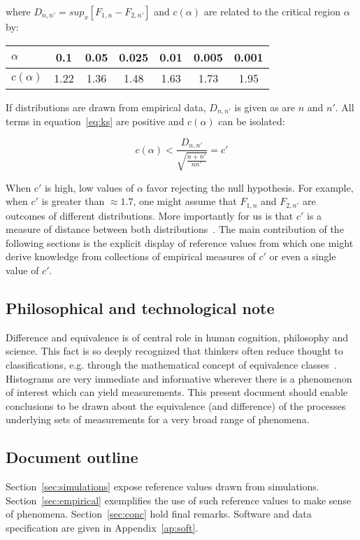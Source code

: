 \documentclass[%
	aip,
	jmp,%
	amsmath,amssymb,
	reprint,%
]{revtex4-1}
\begin{document}
\noindent where $D_{n,n'}=sup_x[F_{1,n}-F_{2,n'}]$ and $c(\alpha)$ are related to the critical region $\alpha$ by:

\begin{table}[h!]
\centering
\begin{tabular}{|l||c|c|c|c|c|c|}\hline
$\alpha$    & 0.1  & 0.05 & 0.025 & 0.01 & 0.005 & 0.001 \\\hline
$c(\alpha)$ & 1.22 & 1.36 & 1.48  & 1.63 & 1.73  & 1.95  \\\hline
\end{tabular}
\end{table}

If distributions are drawn from empirical data, $D_{n,n'}$ is given as are $n$ and $n'$.
All terms in equation~\ref{eq:ks} are positive and $c(\alpha)$ can be isolated:

\begin{equation}\label{eq:ks2}
c(\alpha) < \frac{D_{n,n'}}{\sqrt{\frac{n+n'}{nn'}}} = c'
\end{equation}

When $c'$ is high, low values of $\alpha$ favor rejecting the null hypothesis.
For example, when $c'$ is greater than $\approx 1.7$,
one might assume that $F_{1,n}$ and $F_{2,n'}$
are outcomes of different distributions.
More importantly for us is that $c'$
is a measure of distance between both distributions~\cite{kolm}.
The main contribution of the following sections is the
explicit display of reference values from which
one might derive knowledge from collections of empirical measures of $c'$
or even a single value of $c'$.

\subsection{Philosophical and technological note}
Difference and equivalence is of central role in human cognition,
philosophy and science.
This fact is so deeply recognized that thinkers often reduce
thought to classifications, e.g. through the
mathematical concept of equivalence classes~\cite{deleuze,physics}.
Histograms are very immediate and informative
wherever there is a phenomenon of interest which can yield measurements.
This present document should enable conclusions to be drawn about 
the equivalence (and difference)
of the processes underlying sets of measurements for a very
broad range of phenomena.

\subsection{Document outline}
Section~\ref{sec:simulations} expose reference values drawn from simulations.
Section~\ref{sec:empirical} exemplifies the use of such reference values
to make sense of phenomena.
Section~\ref{sec:conc} hold final remarks.
Software and data specification are given in Appendix~\ref{ap:soft}.
\end{document}
